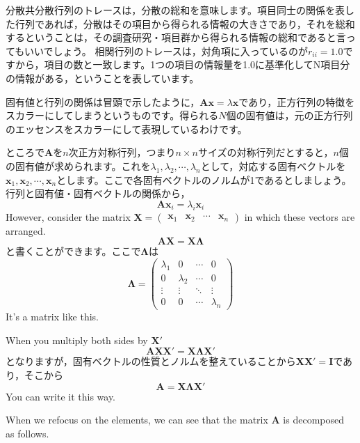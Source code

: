 \documentclass{ltjsbook}
\begin{document}
分散共分散行列のトレースは，分散の総和を意味します。項目同士の関係を表した行列であれば，分散はその項目から得られる情報の大きさであり，それを総和するということは，その調査研究・項目群から得られる情報の総和であると言ってもいいでしょう。
相関行列のトレースは，対角項に入っているのが$r_{ii}=1.0$ですから，項目の数と一致します。1つの項目の情報量を1.0に基準化してN項目分の情報がある，ということを表しています。

固有値と行列の関係は冒頭で示したように，$\bm{Ax}=\lambda \bm{x}$であり，正方行列の特徴をスカラーにしてしまうというものです。得られる$N$個の固有値は，元の正方行列のエッセンスをスカラーにして表現しているわけです。

ところで$\bm{A}$を$n$次正方対称行列，つまり$n \times n$サイズの対称行列だとすると，$n$個の固有値が求められます。これを$\lambda_1,\lambda_2,\cdots,\lambda_n$として，対応する固有ベクトルを$\bm{x}_1,\bm{x}_2,\cdots,\bm{x}_n$とします。ここで各固有ベクトルのノルムが1であるとしましょう。行列と固有値・固有ベクトルの関係から，
\[ \bm{Ax}_i = \lambda_i\bm{x}_i\]
However, consider the matrix $\bm{X}=\begin{pmatrix}\bm{x}_1&\bm{x}_2& \cdots & \bm{x}_n\end{pmatrix}$ in which these vectors are arranged.
\[ \bm{AX} = \bm{X \Lambda} \]
と書くことができます。ここで$\bm{\Lambda}$は
\[ \bm{\Lambda} =
	\begin{pmatrix} \lambda_1 & 0         & \cdots & 0         \\
                0         & \lambda_2 & \cdots & 0         \\
                \vdots    & \vdots    & \ddots & \vdots    \\
                0         & 0         & \cdots & \lambda_n\end{pmatrix}
\]
It's a matrix like this.

When you multiply both sides by $\bm{X}'$
\[ \bm{AXX}' = \bm{X \Lambda X}' \]
となりますが，固有ベクトルの性質とノルムを整えていることから$\bm{XX}'=\bm{I}$であり，そこから
\[ \bm{A} = \bm{X \Lambda X}' \]
You can write it this way.

When we refocus on the elements, we can see that the matrix $\bm{A}$ is decomposed as follows.
\end{document}
